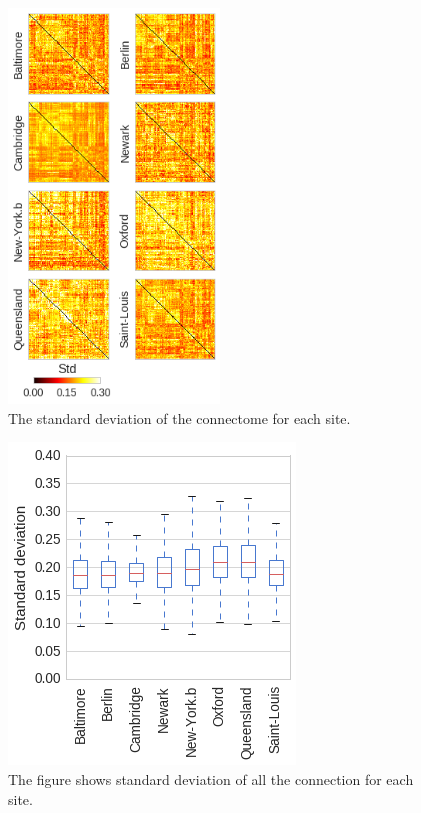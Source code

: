 \documentclass[authoryear]{elsarticle}
\begin{document}
\begin{figure}[htbp]
\centering
\includegraphics[width=0.50\textwidth]{../figures/connectome_std_multisite2.png}
\caption[]{
The standard deviation of the connectome for each site.
}
\label{fig_std_connectomes}
\end{figure}



\begin{figure}[htbp]
\begin{center}
\includegraphics[width=0.75\linewidth]{../figures/multisite_std_distribution.png}
\end{center}
\caption[Standard deviation of the connections across sites]{
The figure shows standard deviation of all the connection for each site.
}
\label{fig_std_connectomes_distribution}
\end{figure}
\end{document}
